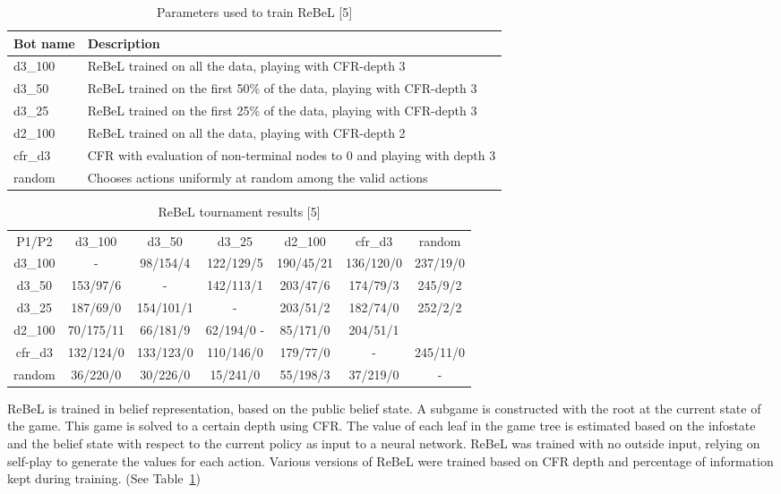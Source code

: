 \documentclass{article}
\begin{document}
\begin{table}
  \caption{Parameters used to train ReBeL [5]}
  \label{rebel-train}
  \centering
  \begin{tabular}{ll}
    \toprule
    Bot name	& Description \\ \midrule
    d3\_100	& ReBeL trained on all the data, playing with CFR-depth 3 \\
    d3\_50	& ReBeL trained on the first 50\% of the data, playing with CFR-depth 3 \\
    d3\_25 	& ReBeL trained on the first 25\% of the data, playing with CFR-depth 3 \\
    d2\_100 	& ReBeL trained on all the data, playing with CFR-depth 2 \\
    cfr\_d3 	& CFR with evaluation of non-terminal nodes to 0 and playing with depth 3 \\
    random 	& Chooses actions uniformly at random among the valid actions \\
    \bottomrule
  \end{tabular}
\end{table}

\begin{table}
  \caption{ReBeL tournament results [5]}
  \label{rebel-results}
  \centering
  \begin{tabular}{ccccccc}
    \toprule
    P1/P2 & d3\_100 & d3\_50 & d3\_25 & d2\_100 & cfr\_d3 & random \\
d3\_100 & - & 98/154/4 & 122/129/5 & 190/45/21 & 136/120/0 & 237/19/0 \\
d3\_50 & 153/97/6 & - & 142/113/1 & 203/47/6 & 174/79/3 & 245/9/2 \\
d3\_25 & 187/69/0 & 154/101/1 & - & 203/51/2 & 182/74/0 & 252/2/2 \\
d2\_100 & 70/175/11 & 66/181/9 & 62/194/0 - & 85/171/0 & 204/51/1 \\
cfr\_d3 & 132/124/0 & 133/123/0 & 110/146/0 & 179/77/0 & - & 245/11/0 \\
random & 36/220/0 & 30/226/0 & 15/241/0 & 55/198/3 & 37/219/0 & - \\
    \bottomrule
  \end{tabular}
\end{table}

ReBeL is trained in belief representation, based on the public belief state. A subgame is constructed with the root at the current state of the game. This game is solved to a certain depth using CFR. 
The value of each leaf in the game tree is estimated based on the infostate and the belief state with respect to the current policy as input to a neural network.  
ReBeL was trained with no outside input, relying on self-play to generate the values for each action. Various versions of ReBeL were trained based on CFR depth and percentage of information kept during training. (See Table~\ref{rebel-train})
\end{document}
